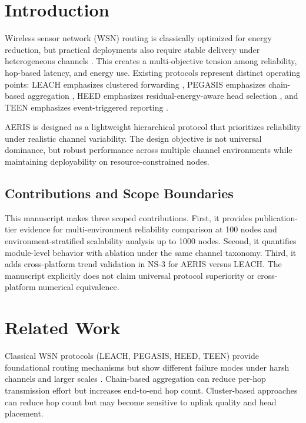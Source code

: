 \documentclass[sensors,article,submit,moreauthors,pdftex]{Definitions/mdpi}
\begin{document}
\section{Introduction}
Wireless sensor network (WSN) routing is classically optimized for energy reduction, but practical deployments also require stable delivery under heterogeneous channels \cite{Akyildiz2002Survey,Rault2016Energy}. This creates a multi-objective tension among reliability, hop-based latency, and energy use. Existing protocols represent distinct operating points: LEACH emphasizes clustered forwarding \cite{Heinzelman2000LEACH}, PEGASIS emphasizes chain-based aggregation \cite{Lindsey2002PEGASIS}, HEED emphasizes residual-energy-aware head selection \cite{Younis2004HEED}, and TEEN emphasizes event-triggered reporting \cite{Manjeshwar2001TEEN}.

AERIS is designed as a lightweight hierarchical protocol that prioritizes reliability under realistic channel variability. The design objective is not universal dominance, but robust performance across multiple channel environments while maintaining deployability on resource-constrained nodes.

\subsection*{Contributions and Scope Boundaries}
This manuscript makes three scoped contributions. First, it provides publication-tier evidence for multi-environment reliability comparison at 100 nodes and environment-stratified scalability analysis up to 1000 nodes. Second, it quantifies module-level behavior with ablation under the same channel taxonomy. Third, it adds cross-platform trend validation in NS-3 for AERIS versus LEACH. The manuscript explicitly does not claim universal protocol superiority or cross-platform numerical equivalence.

\section{Related Work}
Classical WSN protocols (LEACH, PEGASIS, HEED, TEEN) provide foundational routing mechanisms but show different failure modes under harsh channels and larger scales \cite{Heinzelman2002LEACH,Lindsey2002PEGASIS,Younis2004HEED}. Chain-based aggregation can reduce per-hop transmission effort but increases end-to-end hop count. Cluster-based approaches can reduce hop count but may become sensitive to uplink quality and head placement.
\end{document}
